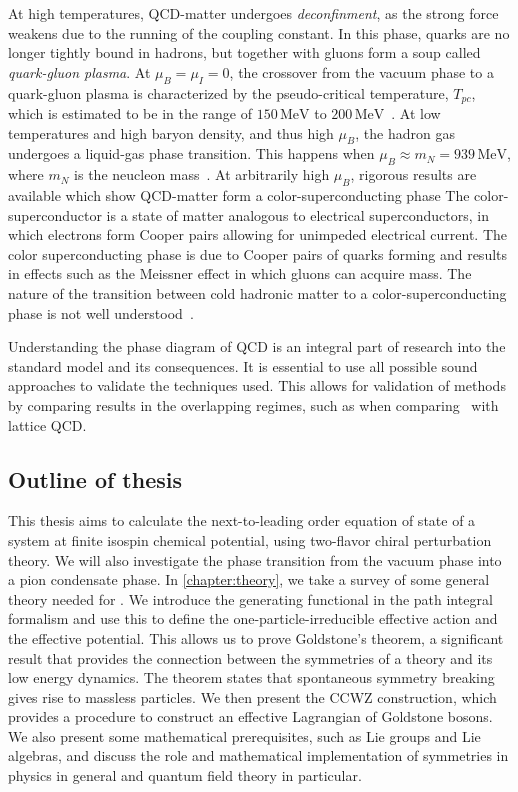 At high temperatures, QCD-matter undergoes \emph{deconfinment}, as the strong force weakens due to the running of the coupling constant.
In this phase, quarks are no longer tightly bound in hadrons, but together with gluons form a soup called \emph{quark-gluon plasma}.
At $\mu_B = \mu_I = 0$, the crossover from the vacuum phase to a quark-gluon plasma is characterized by the pseudo-critical temperature, $T_{pc}$, which is estimated to be in the range of $150 \, \text{MeV}$ to $200 \, \text{MeV}$~\cite{Fukushima:The_phase_diagram_of_dense_QCD}.
At low temperatures and high baryon density, and thus high $\mu_B$, the hadron gas undergoes a liquid-gas phase transition.
This happens when $\mu_B \approx m_N = 939 \, \text{MeV}$, where $m_N$ is the neucleon mass~\cite{Fukushima:The_phase_diagram_of_dense_QCD}.
At arbitrarily high $\mu_B$, rigorous results are available which show QCD-matter form a color-superconducting phase
The color-superconductor is a state of matter analogous to electrical superconductors, in which electrons form Cooper pairs allowing for unimpeded electrical current.
The color superconducting phase is due to Cooper pairs of quarks forming and results in effects such as the Meissner effect in which gluons can acquire mass.
The nature of the transition between cold hadronic matter to a color-superconducting phase is not well understood~\cite{alford:color_superconductivity}.

Understanding the phase diagram of QCD is an integral part of research into the standard model and its consequences.
It is essential to use all possible sound approaches to validate the techniques used.
This allows for validation of methods by comparing results in the overlapping regimes, such as when comparing \chpt\ with lattice QCD.


\subsection*{Outline of thesis}
This thesis aims to calculate the next-to-leading order equation of state of a system at finite isospin chemical potential, using two-flavor chiral perturbation theory.
We will also investigate the phase transition from the vacuum phase into a pion condensate phase.
In \autoref{chapter:theory}, we take a survey of some general theory needed for \chpt.
We introduce the generating functional in the path integral formalism and use this to define the one-particle-irreducible effective action and the effective potential.
This allows us to prove Goldstone's theorem, a significant result that provides the connection between the symmetries of a theory and its low energy dynamics.
The theorem states that spontaneous symmetry breaking gives rise to massless particles.
We then present the CCWZ construction, which provides a procedure to construct an effective Lagrangian of Goldstone bosons.
We also present some mathematical prerequisites, such as Lie groups and Lie algebras, and discuss the role and mathematical implementation of symmetries in physics in general and quantum field theory in particular.


